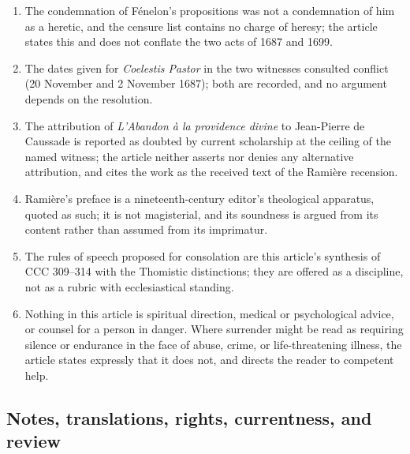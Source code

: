 \begin{enumerate}[leftmargin=1.45em,itemsep=0.25em]
\item The condemnation of Fénelon's propositions was not a condemnation of him as a heretic, and the censure list contains no charge of heresy; the article states this and does not conflate the two acts of 1687 and 1699.
\item The dates given for \emph{Coelestis Pastor} in the two witnesses consulted conflict (20 November and 2 November 1687); both are recorded, and no argument depends on the resolution.
\item The attribution of \emph{L'Abandon à la providence divine} to Jean-Pierre de Caussade is reported as doubted by current scholarship at the ceiling of the named witness; the article neither asserts nor denies any alternative attribution, and cites the work as the received text of the Ramière recension.
\item Ramière's preface is a nineteenth-century editor's theological apparatus, quoted as such; it is not magisterial, and its soundness is argued from its content rather than assumed from its imprimatur.
\item The rules of speech proposed for consolation are this article's synthesis of CCC 309--314 with the Thomistic distinctions; they are offered as a discipline, not as a rubric with ecclesiastical standing.
\item Nothing in this article is spiritual direction, medical or psychological advice, or counsel for a person in danger. Where surrender might be read as requiring silence or endurance in the face of abuse, crime, or life-threatening illness, the article states expressly that it does not, and directs the reader to competent help.
\end{enumerate}

\subsection{Notes, translations, rights, currentness, and review}

